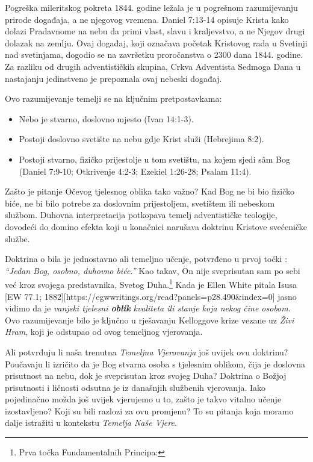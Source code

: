 Pogreška mileritskog pokreta 1844. godine ležala je u pogrešnom razumijevanju prirode događaja, a ne njegovog vremena. Daniel 7:13-14 opisuje Krista kako dolazi Pradavnome na nebu da primi vlast, slavu i kraljevstvo, a ne Njegov drugi dolazak na zemlju. Ovaj događaj, koji označava početak Kristovog rada u Svetinji nad svetinjama, dogodio se na završetku proročanstva o 2300 dana 1844. godine. Za razliku od drugih adventističkih skupina, Crkva Adventista Sedmoga Dana u nastajanju jedinstveno je prepoznala ovaj nebeski događaj.

Ovo razumijevanje temelji se na ključnim pretpostavkama:
\begin{itemize}
    \item Nebo je stvarno, doslovno mjesto (Ivan 14:1-3).
    \item Postoji doslovno svetište na nebu gdje Krist služi (Hebrejima 8:2).
    \item Postoji stvarno, fizičko prijestolje u tom svetištu, na kojem sjedi sâm Bog (Daniel 7:9-10; Otkrivenje 4:2-3; Ezekiel 1:26-28; Psalam 11:4).
\end{itemize}

Zašto je pitanje Očevog tjelesnog oblika tako važno? Kad Bog ne bi bio fizičko biće, ne bi bilo potrebe za doslovnim prijestoljem, svetištem ili nebeskom službom. Duhovna interpretacija potkopava temelj adventističke teologije, dovodeći do domino efekta koji u konačnici narušava doktrinu Kristove svećeničke službe.

Doktrina o  bila je jednostavno ali temeljno učenje, potvrđeno u prvoj točki : \textit{“Jedan Bog, osobno, duhovno biće.”} Kao takav, On nije sveprisutan sam po sebi već kroz svojega predstavnika, Svetog Duha.\footnote{Prva točka Fundamentalnih Principa: } Kada je Ellen White pitala Isusa [EW 77.1; 1882][https://egwwritings.org/read?panels=p28.490&index=0] jasno vidimo da je \textit{vanjski tjelesni \textbf{oblik}} \textit{kvaliteta ili stanje koja nekog čine osobom}. Ovo razumijevanje bilo je ključno u rješavanju Kelloggove krize vezane uz \textit{Živi Hram}, koji je odstupao od ovog temeljnog vjerovanja.

Ali potvrđuju li naša trenutna \textit{Temeljna Vjerovanja} još uvijek ovu doktrinu? Poučavaju li izričito da je Bog stvarna osoba s tjelesnim oblikom, čija je doslovna prisutnost na nebu, dok je sveprisutan kroz svojeg Duha? Doktrina o Božjoj prisutnosti i ličnosti odsutna je iz današnjih službenih vjerovanja. Iako pojedinačno možda još uvijek vjerujemo u to, zašto je takvo vitalno učenje izostavljeno? Koji su bili razlozi za ovu promjenu? To su pitanja koja moramo dalje istražiti u kontekstu \textit{Temelja Naše Vjere}.

